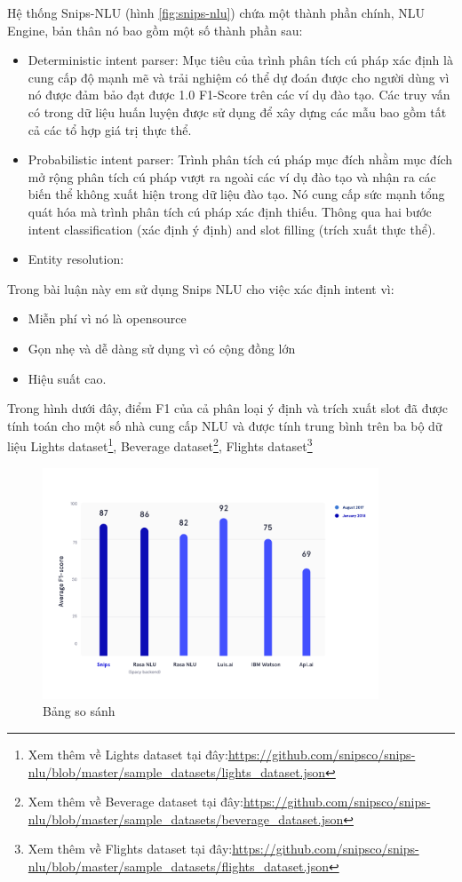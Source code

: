 \begin{itemize}
          Hệ thống Snips-NLU (hình \ref{fig:snips-nlu}) chứa một thành phần chính, NLU Engine, bản thân nó bao gồm một số thành phần sau:
          \begin{itemize}
              \item Deterministic intent parser: Mục tiêu của trình phân tích cú pháp xác định là cung cấp độ mạnh mẽ và trải nghiệm có thể dự đoán được cho người dùng vì nó được đảm bảo đạt được 1.0 F1-Score trên các ví dụ đào tạo. Các truy vấn có trong dữ liệu huấn luyện được sử dụng để xây dựng các mẫu bao gồm tất cả các tổ hợp giá trị thực thể.
              \item Probabilistic intent parser: Trình phân tích cú pháp mục đích nhằm mục đích mở rộng phân tích cú pháp vượt ra ngoài các ví dụ đào tạo và nhận ra các biến thể không xuất hiện trong dữ liệu đào tạo. Nó cung cấp sức mạnh tổng quát hóa mà trình phân tích cú pháp xác định thiếu. Thông qua hai bước intent classification (xác định ý định) and slot filling (trích xuất thực thể).
              \item Entity resolution:
          \end{itemize}
\end{itemize}
Trong bài luận này em sử dụng Snips NLU cho việc xác định intent vì:
\begin{itemize}
    \item Miễn phí vì nó là opensource
    \item Gọn nhẹ và dễ dàng sử dụng vì có cộng đồng lớn
    \item Hiệu suất cao.
\end{itemize}
Trong hình dưới đây, điểm F1 của cả phân loại ý định và trích xuất slot đã được tính toán cho một số nhà cung cấp NLU và được tính trung bình trên ba bộ dữ liệu Lights dataset\footnote{Xem thêm về Lights dataset tại đây:\url{https://github.com/snipsco/snips-nlu/blob/master/sample_datasets/lights_dataset.json}}, Beverage dataset\footnote{Xem thêm về Beverage dataset tại đây:\url{https://github.com/snipsco/snips-nlu/blob/master/sample_datasets/beverage_dataset.json}}, Flights dataset\footnote{Xem thêm về Flights dataset tại đây:\url{https://github.com/snipsco/snips-nlu/blob/master/sample_datasets/flights_dataset.json}}
\begin{figure}[htp]
    \centering
    \includegraphics[width=10cm]{images/benchmarks.png}
    \caption{Bảng so sánh}
    \label{fig:benchmarks}
\end{figure}